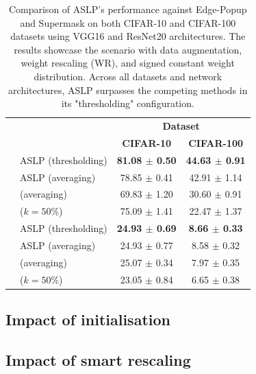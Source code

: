 \begin{table}[htbp]
  \centering\begin{tabular}{llcc}
    \cmidrule[\heavyrulewidth]{3-4}
     &  & \multicolumn{2}{c}{\textbf{Dataset}} \\
     &  & \textbf{CIFAR-10} & \textbf{CIFAR-100}  \\
    \toprule
    \multirow{6}{*}{} \multirow{4}{*}{\textbf{ResNet20}} & ASLP (thresholding) &\textbf{ 81.08 $\pm$ 0.50} & \textbf{44.63 $\pm$ 0.91} \\
    & ASLP (averaging)& 78.85 $\pm$ 0.41 & 42.91 $\pm$ 1.14 \\ 
    & \cite{DBLP:conf/nips/ZhouLLY19} (averaging)  & 69.83 $\pm$ 1.20 & 30.60 $\pm$ 0.91 \\
    & \cite{DBLP:conf/cvpr/RamanujanWKFR20} ($k=50\%$) & 75.09 $\pm$ 1.41 & 22.47 $\pm$ 1.37 \\
    \midrule
     \multirow{4}{*}{\textbf{VGG16}} & ASLP (thresholding) & \textbf{24.93 $\pm$ 0.69} & \textbf{8.66 $\pm$ 0.33} \\
     & ASLP (averaging) & 24.93 $\pm$ 0.77 & 8.58 $\pm$ 0.32 \\
     & \cite{DBLP:conf/nips/ZhouLLY19} (averaging)  & 25.07 $\pm$ 0.34 & 7.97 $\pm$ 0.35 \\
     & \cite{DBLP:conf/cvpr/RamanujanWKFR20} ($k=50\%$) & 23.05 $\pm$ 0.84 & 6.65 $\pm$ 0.38 \\
    \bottomrule
    \end{tabular}
  \caption{Comparison of ASLP's performance against Edge-Popup and Supermask
  \cite{DBLP:conf/cvpr/RamanujanWKFR20,DBLP:conf/nips/ZhouLLY19} on both
  CIFAR-10 and CIFAR-100 datasets using VGG16 and ResNet20 architectures. The
  results showcase the scenario with data augmentation, weight rescaling (WR),
  and signed constant weight distribution. Across all datasets and network
  architectures, ASLP surpasses the competing methods in its "thresholding"
  configuration.}
  \label{tab:chap2:r20_VGG16_performances_comparison}
\end{table}



\subsection{Impact of initialisation}

\subsection{Impact of smart rescaling}

